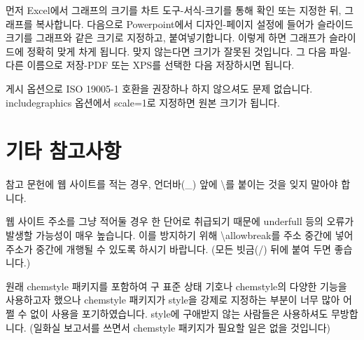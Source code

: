 \documentclass[a4paper,10pt]{article}
\begin{document}
	먼저 Excel에서 그래프의 크기를 차트 도구-서식-크기를 통해
	확인 또는 지정한 뒤, 그래프를 복사합니다.
	다음으로 Powerpoint에서 디자인-페이지 설정에 들어가 슬라이드 크기를
	그래프와 같은 크기로 지정하고, 붙여넣기합니다.
	이렇게 하면 그래프가 슬라이드에 정확히 맞게 차게 됩니다.
	맞지 않는다면 크기가 잘못된 것입니다.
	그 다음 파일-다른 이름으로 저장-PDF 또는 XPS를 선택한 다음
	저장하시면 됩니다.
	
	게시 옵션으로 ISO 19005-1 호환을 권장하나 하지 않으셔도 문제 없습니다.
	includegraphics 옵션에서 scale=1로 지정하면 원본 크기가 됩니다.
	
	\section{기타 참고사항}
	참고 문헌에 웹 사이트를 적는 경우, 언더바(\_) 앞에 \textbackslash 를
	붙이는 것을 잊지 말아야 합니다.
	
	웹 사이트 주소를 그냥 적어둘 경우 한 단어로 취급되기 때문에 underfull 
	등의 오류가 발생할 가능성이 매우 높습니다.
	이를 방지하기 위해 \textbackslash allowbreak를 주소 중간에 넣어 주소가
	중간에 개행될 수 있도록 하시기 바랍니다.
	(모든 빗금(/) 뒤에 붙여 두면 좋습니다.)	
	
	원래 chemstyle 패키지를 포함하여 구 표준 상태 기호나 chemstyle의 
	다양한 기능을 사용하고자 했으나 chemstyle 패키지가 style을 강제로
	지정하는 부분이 너무 많아 어쩔 수 없이 사용을 포기하였습니다.
	style에 구애받지 않는 사람들은 사용하셔도 무방합니다.
	(일화실 보고서를 쓰면서 chemstyle 패키지가 필요할 일은 없을 것입니다)
	
\end{document}
